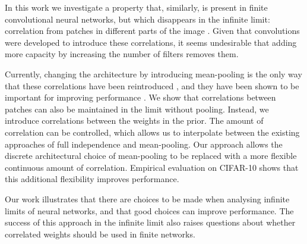 \documentclass{article}
\begin{document}
In this work we investigate a property that, similarly, is present in finite convolutional neural networks, but which disappears in the infinite limit: correlation from patches in different parts of the image \citep{garriga2018infiniteconv,novak2019infiniteconv}. Given that convolutions were developed to introduce these correlations, it seems undesirable that adding more capacity by increasing the number of filters removes them.

Currently, changing the architecture by introducing mean-pooling is the only way that these correlations have been reintroduced \citep{novak2019infiniteconv}, and they have been shown to be important for improving performance \citep{arora2019exact}. We show that correlations between patches can also be maintained in the limit without pooling. Instead, we introduce correlations between the weights in the prior. The amount of correlation can be controlled, which allows us to interpolate between the existing approaches of full independence and mean-pooling. Our approach allows the discrete architectural choice of mean-pooling to be replaced with a more flexible continuous amount of correlation. Empirical evaluation on CIFAR-10 shows that this additional flexibility improves performance.

Our work illustrates that there are choices to be made when analysing infinite limits of neural networks, and that good choices can improve performance. The success of this approach in the infinite limit also raises questions about whether correlated weights should be used in finite networks.
\end{document}
